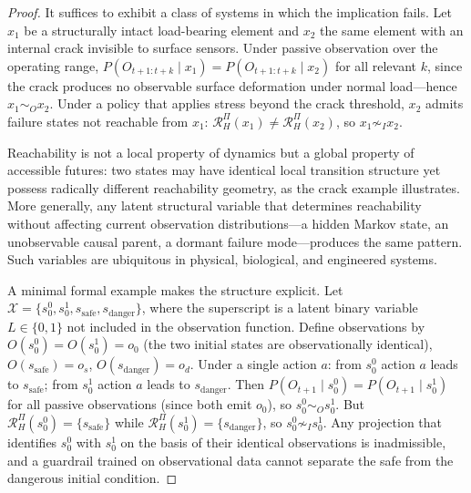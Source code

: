 \documentclass[11pt, a4paper]{article}
\theoremstyle{plain}
\theoremstyle{definition}
\theoremstyle{remark}
\newcommand{\simO}{\sim_O}
\newcommand{\simI}{\sim_I}
\newcommand{\RHP}{\mathcal{R}_H^\Pi}
\begin{document}
\begin{proof}
It suffices to exhibit a class of systems in which the implication fails. Let
$x_1$ be a structurally intact load-bearing element and $x_2$ the same element
with an internal crack invisible to surface sensors. Under passive observation
over the operating range, $P(O_{t+1:t+k} \mid x_1) = P(O_{t+1:t+k} \mid x_2)$
for all relevant $k$, since the crack produces no observable surface deformation
under normal load---hence $x_1 \simO x_2$. Under a policy that applies
stress beyond the crack threshold, $x_2$ admits failure states not reachable
from $x_1$: $\RHP(x_1) \neq \RHP(x_2)$, so $x_1 \not\simI x_2$.

Reachability is not a local property of dynamics but a global property of
accessible futures: two states may have identical local transition structure
yet possess radically different reachability geometry, as the crack example
illustrates. More generally, any latent structural variable that determines reachability
without affecting current observation distributions---a hidden Markov state, an
unobservable causal parent, a dormant failure mode---produces the same pattern.
Such variables are ubiquitous in physical, biological, and engineered systems.

A minimal formal example makes the structure explicit. Let
$\mathcal{X} = \{s_0^0, s_0^1, s_{\text{safe}}, s_{\text{danger}}\}$, where
the superscript is a latent binary variable $L \in \{0,1\}$ not included in
the observation function. Define observations by $O(s_0^0) = O(s_0^1) = o_0$
(the two initial states are observationally identical), $O(s_{\text{safe}}) =
o_s$, $O(s_{\text{danger}}) = o_d$. Under a single action $a$: from $s_0^0$
action $a$ leads to $s_{\text{safe}}$; from $s_0^1$ action $a$ leads to
$s_{\text{danger}}$. Then $P(O_{t+1} \mid s_0^0) = P(O_{t+1} \mid s_0^1)$
for all passive observations (since both emit $o_0$), so $s_0^0 \simO s_0^1$.
But $\RHP(s_0^0) = \{s_{\text{safe}}\}$ while $\RHP(s_0^1) =
\{s_{\text{danger}}\}$, so $s_0^0 \not\simI s_0^1$. Any projection that
identifies $s_0^0$ with $s_0^1$ on the basis of their identical observations
is inadmissible, and a guardrail trained on observational data cannot separate
the safe from the dangerous initial condition.
\end{proof}
\end{document}
